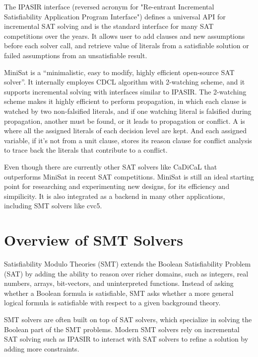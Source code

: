 The IPASIR interface (reversed acronym for "Re-entrant Incremental Satisfiability Application Program Interface") defines a universal API for incremental SAT solving and is the standard interface for many SAT competitions over the years. \cite{BALYO201645} It allows user to add clauses and new assumptions before each solver call, and retrieve value of literals from a satisfiable solution or failed assumptions from an unsatisfiable result.


MiniSat is a ``minimalistic, easy to modify, highly efficient open-source SAT solver''. It internally employes CDCL algorithm with 2-watching scheme, and it supports incremental solving with interfaces similar to IPASIR. The 2-watching scheme makes it highly efficient to perform propagation, in which each clause is watched by two non-falsified literals, and if one watching literal is falsified during propagation, another must be found, or it leads to propagation or conflict. A  is where all the assigned literals of each decision level are kept. And each assigned variable, if it's not from a unit clause, stores its reason clause for conflict analysis to trace back the literals that contribute to a conflict.

Even though there are currently other SAT solvers like CaDiCaL that outperforms MiniSat in recent SAT competitions. MiniSat is still an ideal starting point for researching and experimenting new designs, for its efficiency and simpilicity. It is also integrated as a backend in many other applications, including SMT solvers like cvc5.

\section{Overview of SMT Solvers}

Satisfiability Modulo Theories (SMT) extends the Boolean Satisfiability Problem (SAT) by adding the ability to reason over richer domains, such as integers, real numbers, arrays, bit-vectors, and uninterpreted functions. Instead of asking whether a Boolean formula is satisfiable, SMT asks whether a more general logical formula is satisfiable with respect to a given background theory.

SMT solvers are often built on top of SAT solvers, which specialize in solving the Boolean part of the SMT problems. Modern SMT solvers rely on incremental SAT solving such as IPASIR to interact with SAT solvers to refine a solution by adding more constraints.

